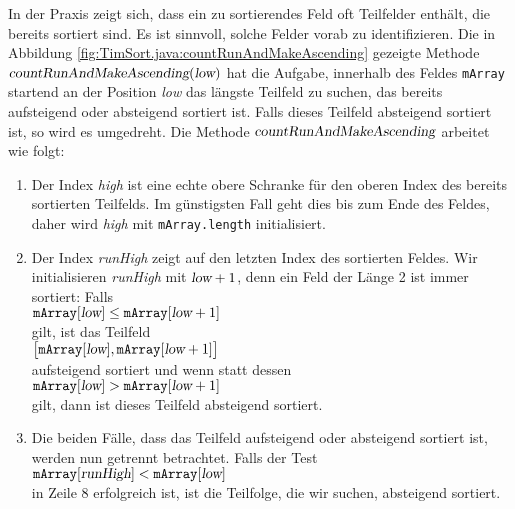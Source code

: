 \noindent
In der Praxis zeigt sich, dass ein zu sortierendes Feld
oft Teilfelder enth\"alt, die bereits sortiert sind.  Es ist sinnvoll, solche Felder vorab zu
identifizieren.  Die in Abbildung \ref{fig:TimSort.java:countRunAndMakeAscending} gezeigte
 Methode $\textsl{countRunAndMakeAscending}(\textsl{low})$ hat die Aufgabe,
innerhalb des Feldes \texttt{mArray}  startend an der Position \textsl{low} das l\"angste Teilfeld zu
suchen, das bereits aufsteigend oder absteigend sortiert ist.   Falls dieses Teilfeld absteigend
sortiert ist, so wird es umgedreht.  Die Methode $\textsl{countRunAndMakeAscending}$ arbeitet
wie folgt:
\begin{enumerate}
\item Der Index \textsl{high} ist eine echte obere Schranke f\"ur den oberen Index des bereits 
      sortierten Teilfelds.  Im g\"unstigsten Fall geht dies bis zum Ende des Feldes,
      daher wird \textsl{high} mit \texttt{mArray.length} initialisiert.
\item Der Index \textsl{runHigh} zeigt auf den letzten Index des sortierten Feldes.
      Wir initialisieren \textsl{runHigh} mit $\textsl{low} + 1$, denn ein Feld der L\"ange 2
      ist immer sortiert:  Falls
      \\[0.2cm]
      \hspace*{1.3cm}
      $\mathtt{mArray}[\textsl{low}] \leq \mathtt{mArray}[\textsl{low} + 1]$
      \\[0.2cm]
      gilt, ist das Teilfeld 
      \\[0.2cm]
      \hspace*{1.3cm}
      $\bigl[\mathtt{mArray}[\textsl{low}], \mathtt{mArray}[\textsl{low} + 1]\bigr]$
      \\[0.2cm]
      aufsteigend sortiert und wenn statt dessen \\[0.2cm]
      \hspace*{1.3cm}
      $\mathtt{mArray}[\textsl{low}] > \mathtt{mArray}[\textsl{low} + 1]$
      \\[0.2cm]
      gilt, dann ist dieses Teilfeld absteigend sortiert.
\item Die beiden F\"alle, dass das Teilfeld aufsteigend oder absteigend sortiert ist, werden nun 
      getrennt betrachtet.  Falls der Test 
      \\[0.2cm]
      \hspace*{1.3cm}
      $\mathtt{mArray}[\textsl{runHigh}] < \mathtt{mArray}[\textsl{low}]$
      \\[0.2cm]
      in Zeile 8 erfolgreich ist, ist die Teilfolge, die wir suchen, absteigend sortiert.

\end{enumerate}
